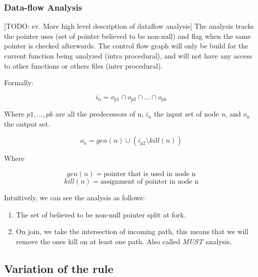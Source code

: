 \subsubsection{Data-flow Analysis}
\label{subsubsec:data_flow_analysis}

[TODO: ev. More high level description of dataflow analysis]
The analysis tracks the pointer uses (set of pointer believed to be non-null) and flag when the same pointer is checked afterwards. 
The control flow graph will only be build for the current function being analyzed (intra procedural), and will not have any access to other functions or others files (inter procedural).

Formally:

\begin{equation}\label{eqn:dataflow1}
i_{n} = o_{p1}  \cap   o_{p2}  \cap  ... \cap   o_{pk}
\end{equation}

Where $p1, ..., pk$ are all the predecessors of n, $i_{n}$ the input set of node \emph{n}, and  $o_{n}$ the output set.

\begin{equation}\label{eqn:dataflow2}
o_{n} = gen(n)  \cup   (i_{p2} \setminus kill(n))
\end{equation}

Where

\begin{equation}\label{eqn:dataflow3}
gen(n) =\text{pointer that is used in node n}
\end{equation}
\begin{equation}\label{eqn:dataflow4}
kill(n) = \text{assignment of pointer in node n}
\end{equation}

Intuitively, we can see the analysis as follows:
\begin{enumerate}
	\item The set of believed to be non-null pointer split at fork. \newline 
	\item On join, we take the intersection of incoming path, this means that we will remove the ones kill on at least one path. Also called \emph{MUST} analysis. \newline 
\end{enumerate}

\subsection{Variation of the rule}
\label{subsec:rule_variation}

